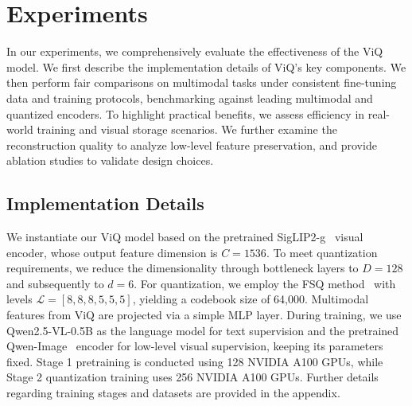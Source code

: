 \section{Experiments}
\label{sec:experiments}

In our experiments, we comprehensively evaluate the effectiveness of the ViQ model. We first describe the implementation details of ViQ's key components. We then perform fair comparisons on multimodal tasks under consistent fine-tuning data and training protocols, benchmarking against leading multimodal and quantized encoders. To highlight practical benefits, we assess efficiency in real-world training and visual storage scenarios. We further examine the reconstruction quality to analyze low-level feature preservation, and provide ablation studies to validate design choices.

\subsection{Implementation Details}

We instantiate our ViQ model based on the pretrained SigLIP2-g~\cite{tschannen2025siglip} visual encoder, whose output feature dimension is $C=1536$. To meet quantization requirements, we reduce the dimensionality through bottleneck layers to $D=128$ and subsequently to $d=6$. For quantization, we employ the FSQ method~\cite{mentzerfinite} with levels $\mathcal{L}=[8,8,8,5,5,5]$, yielding a codebook size of 64,000. Multimodal features from ViQ are projected via a simple MLP layer. During training, we use Qwen2.5-VL-0.5B as the language model for text supervision and the pretrained Qwen-Image~\cite{wu2025qwenimage} encoder for low-level visual supervision, keeping its parameters fixed. Stage 1 pretraining is conducted using 128 NVIDIA A100 GPUs, while Stage 2 quantization training uses 256 NVIDIA A100 GPUs. Further details regarding training stages and datasets are provided in the appendix.

